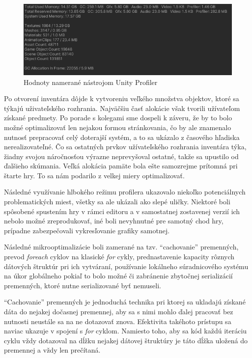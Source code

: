 \documentclass[slovak, bachelorpractice]{diploma}
\begin{document}
\begin{figure}[!htbp]
	\centering
	\includegraphics[width=1\textwidth]{Pictures/profiler.png}
	\caption{Hodnoty namerané nástrojom Unity Profiler}
	\label{pic:Prof}
\end{figure}

Po otvorení inventára dôjde k vytvoreniu veľkého množstva objektov, ktoré sa týkajú uživateľského rozhrania. Najväčšiu časť alokácie však tvorili užívateľom získané predmety. Po porade s kolegami sme dospeli k záveru, že by to bolo možné optimalizovať len nejakou formou stránkovania, čo by ale znamenalo nutnosť prepracovať celý doterajší systém, a to sa ukázalo z časového hľadiska nerealizovateľné. Čo sa ostatných prvkov užívateľského rozhrania inventára týka, žiadny svojou náročnosťou výrazne neprevyšoval ostatné, takže sa upustilo od ďalšieho skúmania. Veľká alokácia pamäte bola ešte samozrejme prítomná pri štarte hry. To sa nám podarilo z velkej miery optimalizovať.

Následné využívanie hlbokého režimu profilera ukazovalo niekoľko potenciálnych problematických miest, všetky sa ale ukázali ako slepé uličky. Niektoré boli spôsobené spustením hry v rámci editoru a v samostatnej zostavenej verzií ich nebolo možné zreprodukovať, iné boli nevyhnutné pre samotný chod hry, prípadne zabezpečovali vykresľovanie grafiky samotnej.

Následné mikrooptimalizácie boli zamerané na tzv. \enquote{cachovanie} premenných, prevod \textit{foreach} cyklov na klasické \textit{for} cykly, prednastavenie kapacity rôznych dátových štruktúr pri ich vytváraní, používanie lokálneho súradnicového systému na úkor globálneho pokiaľ to bolo možné či zabránenie zbytočnej serializácií premenných, ktoré nutne serializované byť nemuseli.

\enquote{Cachovanie} premenných je jednoduchá technika pri ktorej sa ukladajú získané dáta do nejakej dočasnej premennej, aby sa s nimi mohlo ďalej pracovať bez nutnosti neustále sa na ne dotazovať znova. Efektivita takéhoto prístupu sa naviac ukazuje v spojení s \textit{for} cyklom. Namiesto toho, aby sa kód každú iteráciu cyklu vždy dotazoval na dĺžku nejakej dátovej štruktúry je táto dĺžka uložená do premennej a vždy len prečítaná.
\end{document}
